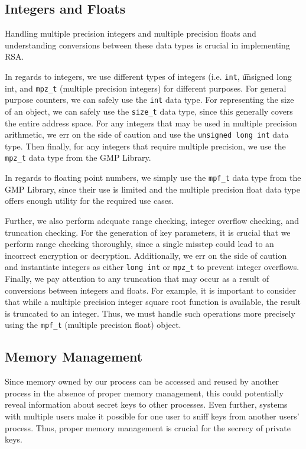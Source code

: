 \documentclass[a4paper]{article}
\begin{document}
\subsection{Integers and Floats}

Handling multiple precision integers and multiple precision floats and understanding conversions between these data types is crucial in implementing RSA.

In regards to integers, we use different types of integers (i.e. {\tt int}, {\t unsigned long int}, and {\tt mpz\_t} (multiple precision integers) for different purposes. For general purpose counters, we can safely use the {\tt int} data type. For representing the size of an object, we can safely use the {\tt size\_t} data type, since this generally covers the entire address space. For any integers that may be used in multiple precision arithmetic, we err on the side of caution
and use the {\tt unsigned long int} data type. Then finally, for any integers that require multiple precision, we use the {\tt mpz\_t} data type from the GMP Library.

In regards to floating point numbers, we simply use the {\tt mpf\_t} data type from the GMP Library, since their use is limited and the multiple precision float data type offers enough utility for the required use cases.

Further, we also perform adequate range checking, integer overflow checking, and truncation checking. For the generation of key parameters, it is crucial that we perform range checking thoroughly, since a
single misstep could lead to an incorrect encryption or decryption. Additionally, we err on the side of caution and instantiate integers as either {\tt long int} or {\tt mpz\_t} to prevent integer overflows. Finally, we pay attention to any truncation that may occur as a result of conversions between integers and floats. For example, it is important to consider that while a multiple precision integer square root function is available, the result is
truncated to an integer. Thus, we must handle such operations more precisely using the {\tt mpf\_t} (multiple precision float) object.

\subsection{Memory Management}

Since memory owned by our process can be accessed and reused by another process in the absence of proper memory management, this could potentially reveal information about secret keys to other processes. Even further, systems with multiple users make it possible for one user to sniff keys from another users' process. Thus, proper memory management is crucial for the secrecy of private keys.
\end{document}
